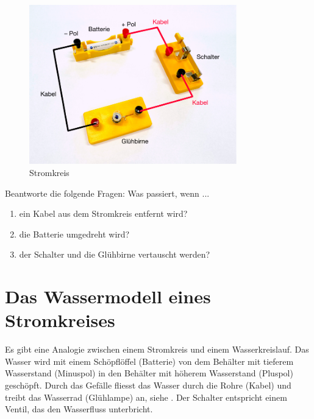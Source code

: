\begin{figure}[h!]
    \centering
    \includegraphics[width=9cm]{_images/stromkreis.pdf}
    \caption{Stromkreis}
    \label{fig:experiment_circuit}
\end{figure}

Beantworte die folgende Fragen: Was passiert, wenn ...

\begin{enumerate}
    \item ein Kabel aus dem Stromkreis entfernt wird?
    \item die Batterie umgedreht wird?
    \item der Schalter und die Glühbirne vertauscht werden?
\end{enumerate}



\newpage
\section{Das Wassermodell eines Stromkreises}
Es gibt eine Analogie zwischen einem Stromkreis und einem Wasserkreislauf.
Das Wasser wird mit einem Schöpflöffel (Batterie) von dem Behälter
mit tieferem Wasserstand (Minuspol) in den Behälter mit höherem Wasserstand
(Pluspol) geschöpft. Durch das Gefälle fliesst das Wasser durch die Rohre
(Kabel) und treibt das Wasserrad (Glühlampe) an, siehe .
Der Schalter entspricht einem Ventil, das den Wasserfluss unterbricht.


